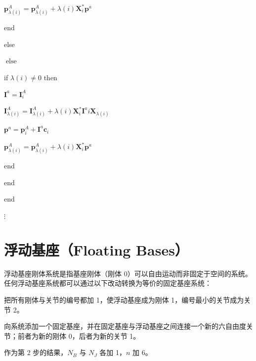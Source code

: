 \documentclass[10pt,a4paper]{book}
\theoremstyle{thmstyle} %
\theoremstyle{defstyle} %
\theoremstyle{prostyle} %
\begin{document}
$ \boldsymbol{p}_{\lambda(i)}^{A}=\boldsymbol{p}_{\lambda(i)}^{A}+\lambda(i) \boldsymbol{X}_{i}^{*} \boldsymbol{p}^{a}$



end



else



$ \operatorname{else}$



if $\lambda(i) \neq 0$ then



$ \boldsymbol{I}^{a}=\boldsymbol{I}_{i}^{A}$



$ \boldsymbol{I}_{\lambda(i)}^{A}=\boldsymbol{I}_{\lambda(i)}^{A}+\lambda(i) \boldsymbol{X}_{i}^{*} \boldsymbol{I}^{a} i \boldsymbol{X}_{\lambda(i)}$



$ \boldsymbol{p}^{a}=\boldsymbol{p}_{i}^{A}+\boldsymbol{I}^{a} \boldsymbol{c}_{i}$



$ \boldsymbol{p}_{\lambda(i)}^{A}=\boldsymbol{p}_{\lambda(i)}^{A}+\lambda(i) \boldsymbol{X}_{i}^{*} \boldsymbol{p}^{a}$



end



end



end



$\vdots$



\section{浮动基座（Floating Bases）}





浮动基座刚体系统是指基座刚体（刚体 0）可以自由运动而非固定于空间的系统。任何浮动基座系统都可以通过以下改动转换为等价的固定基座系统：



把所有刚体与关节的编号都加 1，使浮动基座成为刚体 1，编号最小的关节成为关节 2。



向系统添加一个固定基座，并在固定基座与浮动基座之间连接一个新的六自由度关节；前者为新的刚体 0，后者为新的关节 1。



作为第 2 步的结果，$N_{B}$ 与 $N_{J}$ 各加 1，$n$ 加 6。
\end{document}
